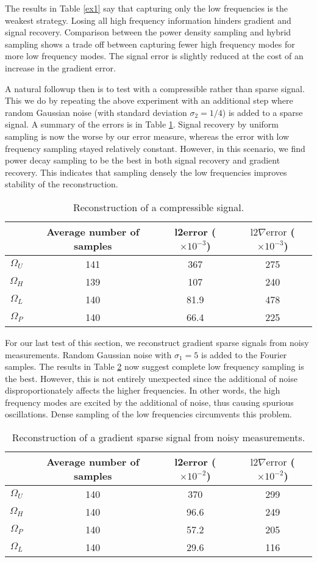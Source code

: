 \documentclass[11pt, oneside]{article}   %
\begin{document}
The results in Table \ref{ex1} say that capturing only the low frequencies is the weakest strategy. Losing all high frequency information hinders gradient and signal recovery. Comparison between the power density sampling and hybrid sampling shows a trade off between capturing fewer high frequency modes for more low frequency modes. The signal error is slightly reduced at the cost of an increase in the gradient error.

A natural followup then is to test with a compressible rather than sparse signal. This we do by repeating the above experiment with an additional step where random Gaussian noise (with standard deviation $\sigma_2 = 1/4$) is added to a sparse signal. A summary of the errors is in Table \ref{1d compressible summary}. Signal recovery by uniform sampling is now the worse by our error measure, whereas the error with low frequency sampling stayed relatively constant. However, in this scenario, we find power decay sampling to be the best in both signal recovery and gradient recovery. This indicates that sampling densely the low frequencies improves stability of the reconstruction.
\begin{table}
	\centering
\begin{tabular}{c|ccc}
        & Average number of samples & l2error ($\times 10^{-3}$) & $\mathrm{l2}\nabla\mathrm{error}$ ($\times 10^{-3}$) \\ \hline
$\Omega_U$ & 141& 367 & 275\\
$\Omega_H$ & 139 & 107 & 240 \\
$\Omega_L$ & 140 & 81.9 & 478 \\ 
$\Omega_P$ & 140 & 66.4 & 225
\end{tabular}
\caption{Reconstruction of a compressible signal.}
\label{1d compressible summary}
\end{table}

For our last test of this section, we reconstruct gradient sparse signals from noisy measurements. Random Gaussian noise with $\sigma_1 = 5$ is added to the Fourier samples. The results in Table \ref{1d noise summary} now suggest complete low frequency sampling is the best. However, this is not entirely unexpected since the additional of noise disproportionately affects the higher frequencies. In other words, the high frequency modes are excited by the additional of noise, thus causing spurious oscillations. Dense sampling of the low frequencies circumvents this problem.

\begin{table}
        \centering
\begin{tabular}{c|ccc}
        & Average number of samples & l2error ($\times 10^{-2}$) & $\mathrm{l2}\nabla\mathrm{error}$ ($\times 10^{-2}$) \\ \hline
$\Omega_U$ & 140& 370 & 299\\
$\Omega_H$ & 140 & 96.6 & 249 \\ 
$\Omega_P$ & 140 & 57.2 & 205 \\
$\Omega_L$ & 140 & 29.6 & 116 
\end{tabular}
\caption{Reconstruction of a gradient sparse signal from noisy measurements.}
\label{1d noise summary}
\end{table}
\end{document}
